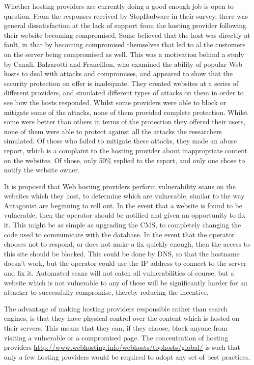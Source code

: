\documentclass{acm_proc_article-sp}
\begin{document}
Whether hosting providers are currently doing a good enough job is open to question.  From the responses received by StopBadware in their survey, there was general dissatisfaction at the lack of support from the hosting provider following their website becoming compromised.  Some believed that the host was directly at fault, in that by becoming compromised themselves that led to al the customers on the server being compromised as well.  This was a motivation behind a study by Canali, Balzarotti and Francillon, who examined the ability of popular Web hosts to deal with attacks and compromises\cite{canaliHostingProviders}, and appeared to show that the security protection on offer is inadequate.  They created websites at a series of different providers, and simulated different types of attacks on them in order to see how the hosts responded.  Whilst some providers were able to block or mitigate some of the attacks, none of them provided complete protection.  Whilst some were better than others in terms of the protection they offered their users, none of them were able to protect against all the attacks the researchers simulated.  Of those who failed to mitigate these attacks, they made an abuse report, which is a complaint to the hosting provider about inappropriate content on the websites.  Of those, only 50\% replied to the report, and only one chose to notify the website owner.

It is proposed that Web hosting providers perform vulnerability scans on the websites which they host, to determine which are vulnerable, similar to the way Antagonist are beginning to roll out\cite{antagonist}.  In the event that a website is found to be vulnerable, then the operator should be notified and given an opportunity to fix it.  This might be as simple as upgrading the CMS, to completely changing the code used to communicate with the database.  In the event that the operator chooses not to respond, or does not make a fix quickly enough, then the access to this site should be blocked.  This could be done by DNS, so that the hostname doesn't work, but the operator could use the IP address to connect to the server and fix it.  Automated scans will not catch all vulnerabilities of course, but a website which is not vulnerable to any of these will be significantly harder for an attacker to successfully compromise, thereby reducing the incentive.

The advantage of making hosting providers responsible rather than search engines, is that they have physical control over the content which is hosted on their servers.  This means that they can, if they choose, block anyone from visiting a vulnerable or a compromised page.  The concentration of hosting providers \url{http://www.webhosting.info/webhosts/tophosts/global/} is such that only a few hosting providers would be required to adopt any set of best practices.
\end{document}
